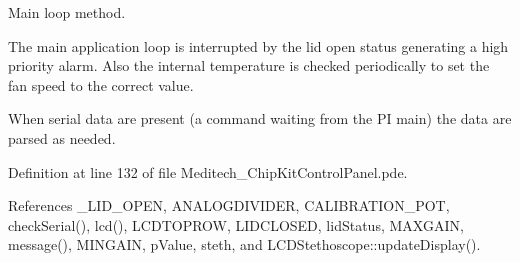Main loop method. 

The main application loop is interrupted by the lid open status generating a high priority alarm. Also the internal temperature is checked periodically to set the fan speed to the correct value.\par
When serial data are present (a command waiting from the P\-I main) the data are parsed as needed. 

Definition at line 132 of file Meditech\-\_\-\-Chip\-Kit\-Control\-Panel.\-pde.



References \-\_\-\-L\-I\-D\-\_\-\-O\-P\-E\-N, A\-N\-A\-L\-O\-G\-D\-I\-V\-I\-D\-E\-R, C\-A\-L\-I\-B\-R\-A\-T\-I\-O\-N\-\_\-\-P\-O\-T, check\-Serial(), lcd(), L\-C\-D\-T\-O\-P\-R\-O\-W, L\-I\-D\-C\-L\-O\-S\-E\-D, lid\-Status, M\-A\-X\-G\-A\-I\-N, message(), M\-I\-N\-G\-A\-I\-N, p\-Value, steth, and L\-C\-D\-Stethoscope\-::update\-Display().


